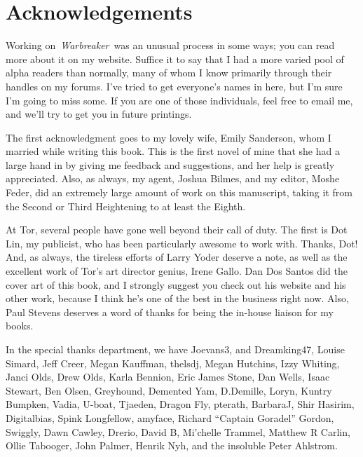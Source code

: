\section{Acknowledgements}

Working on~\textit{Warbreaker}~was an unusual process in some ways; you can read more about it on my website. Suffice it to say that I had a more varied pool of alpha readers than normally, many of whom I know primarily through their handles on my forums. I’ve tried to get everyone’s names in here, but I’m sure I’m going to miss some. If you are one of those individuals, feel free to email me, and we’ll try to get you in future printings.

The first acknowledgment goes to my lovely wife, Emily Sanderson, whom I married while writing this book. This is the first novel of mine that she had a large hand in by giving me feedback and suggestions, and her help is greatly appreciated. Also, as always, my agent, Joshua Bilmes, and my editor, Moshe Feder, did an extremely large amount of work on this manuscript, taking it from the Second or Third Heightening to at least the Eighth.

At Tor, several people have gone well beyond their call of duty. The first is Dot Lin, my publicist, who has been particularly awesome to work with. Thanks, Dot! And, as always, the tireless efforts of Larry Yoder deserve a note, as well as the excellent work of Tor’s art director genius, Irene Gallo. Dan Dos Santos did the cover art of this book, and I strongly suggest you check out his website and his other work, because I think he’s one of the best in the business right now. Also, Paul Stevens deserves a word of thanks for being the in-house liaison for my books.

In the special thanks department, we have Joevans3, and Dreamking47, Louise Simard, Jeff Creer, Megan Kauffman, thelsdj, Megan Hutchins, Izzy Whiting, Janci Olds, Drew Olds, Karla Bennion, Eric James Stone, Dan Wells, Isaac Stewart, Ben Olsen, Greyhound, Demented Yam, D.Demille, Loryn, Kuntry Bumpken, Vadia, U-boat, Tjaeden, Dragon Fly, pterath, BarbaraJ, Shir Hasirim, Digitalbias, Spink Longfellow, amyface, Richard “Captain Goradel” Gordon, Swiggly, Dawn Cawley, Drerio, David B, Mi’chelle Trammel, Matthew R Carlin, Ollie Tabooger, John Palmer, Henrik Nyh, and the insoluble Peter Ahlstrom.

